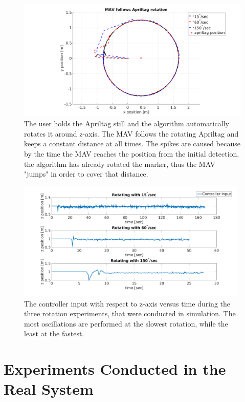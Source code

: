 \begin{figure}
   \centering
   \includegraphics[width=1.00\textwidth]{images/MAV_controller_input_rotation_tracking.pdf}
   \caption{The user holds the Apriltag still and the algorithm automatically rotates it around z-axis. The MAV follows the rotating Apriltag and keeps a constant distance at all times. The spikes are caused because by the time the MAV reaches the position from the initial detection, the algorithm has already rotated the marker, thus the MAV "jumps" in order to cover that distance.}
   \label{pics:xyRotation}
\end{figure}

\begin{figure}
   \centering
   \includegraphics[width=0.98\textwidth]{images/sim_z_axis_during_rotation.pdf}
   \caption{The controller input with respect to z-axis versus time during the three rotation experiments, that were conducted in simulation. The most oscillations are performed at the slowest rotation, while the least at the fastest.}
   \label{pics:zRotationCOntroller}
\end{figure}

 
\section{Experiments Conducted in the Real System}
\label{sec:realExperiments}

